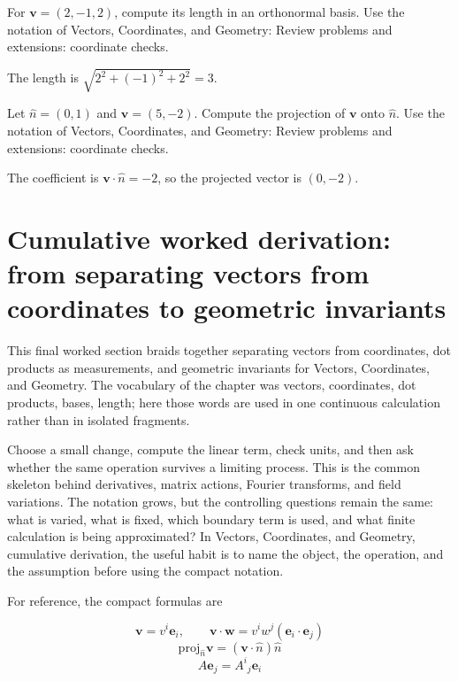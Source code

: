 \begin{exercise}
For \(\bm v=(2,-1,2)\), compute its length in an orthonormal basis.  Use the notation of Vectors, Coordinates, and Geometry: Review problems and extensions: coordinate checks.
\begin{answer}
The length is \(\sqrt{2^2+(-1)^2+2^2}=3\).
\end{answer}
\end{exercise}

\begin{exercise}
Let \(\hat n=(0,1)\) and \(\bm v=(5,-2)\).  Compute the projection of \(\bm v\) onto \(\hat n\).  Use the notation of Vectors, Coordinates, and Geometry: Review problems and extensions: coordinate checks.
\begin{answer}
The coefficient is \(\bm v\cdot\hat n=-2\), so the projected vector is \((0,-2)\).
\end{answer}
\end{exercise}



\section{Cumulative worked derivation: from separating vectors from coordinates to geometric invariants}

This final worked section braids together separating vectors from coordinates, dot products as measurements, and geometric invariants for Vectors, Coordinates, and Geometry.  The vocabulary of the chapter was vectors, coordinates, dot products, bases, length; here those words are used in one continuous calculation rather than in isolated fragments.

Choose a small change, compute the linear term, check units, and then ask whether the same operation survives a limiting process.  This is the common skeleton behind derivatives, matrix actions, Fourier transforms, and field variations.  The notation grows, but the controlling questions remain the same: what is varied, what is fixed, which boundary term is used, and what finite calculation is being approximated?  In Vectors, Coordinates, and Geometry, cumulative derivation, the useful habit is to name the object, the operation, and the assumption before using the compact notation.

For reference, the compact formulas are

\[
  \bm v=v^i\bm e_i,\qquad \bm v\cdot\bm w=v^iw^j(\bm e_i\cdot\bm e_j)
\]
\[
  \mathrm{proj}_{\hat n}\bm v=(\bm v\cdot\hat n)\hat n
\]
\[
  A\bm e_j=A^i{}_j\bm e_i
\]

